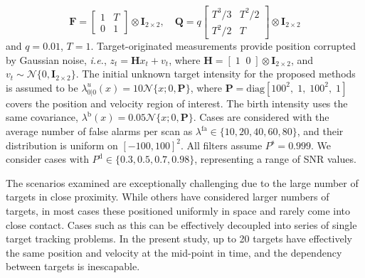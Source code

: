 \documentclass[journal,twoside]{IEEEtran}
\theoremstyle{plain}
\begin{document}
%
\[
\mathbf{F} = \left[\begin{array}{cc}
1 & T \\
0 & 1
\end{array}\right] \otimes \mathbf{I}_{2\times 2}, \quad
%
\mathbf{Q} = q \left[\begin{array}{cc}
T^3/3 & T^2/2 \\
T^2/2 & T
\end{array}\right] \otimes \mathbf{I}_{2\times 2}
\]
%
and $q = 0.01$, $T=1$. 
%
Target-originated measurements provide position corrupted by Gaussian noise, \textit{i.e.}\xspace, $z_t = \mathbf{H} x_t + v_t$, where $\mathbf{H} = [\;1 \;\; 0\;] \otimes \mathbf{I}_{2\times 2}$, and $v_t\sim\mathcal{N}\{0,\mathbf{I}_{2\times 2}\}$. The initial unknown target intensity for the proposed methods is assumed to be $\lambda^u_{0|0}(x)=10\mathcal{N}\{x;0,\mathbf{P}\}$, where $\mathbf{P}=\mathrm{diag}[100^2,\; 1,\; 100^2,\; 1]$ covers the position and velocity region of interest. The birth intensity uses the same covariance, $\lambda^\mathrm{b}(x)=0.05\mathcal{N}\{x;0,\mathbf{P}\}$. Cases are considered with the average number of false alarms per scan as $\lambda^\mathrm{fa}\in\{10,20,40,60,80\}$, and their distribution is uniform on $[-100,100]^2$. All filters assume $P^{\mathrm{s}}=0.999$. We consider cases with $P^{\mathrm{d}}\in\{0.3,0.5,0.7,0.98\}$, representing a range of SNR values.  

The scenarios examined are exceptionally challenging due to the large number of targets in close proximity. While others have considered larger numbers of targets, in most cases these positioned uniformly in space and rarely come into close contact. Cases such as this can be effectively decoupled into series of single target tracking problems. In the present study, up to 20 targets have effectively the same position and velocity at the mid-point in time, and the dependency between targets is inescapable. 
\end{document}
